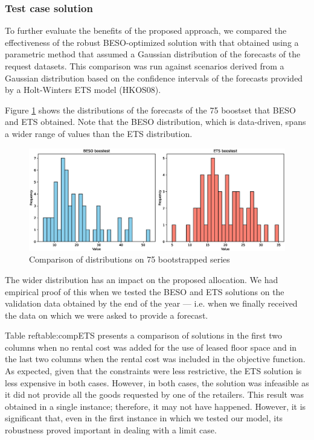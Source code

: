 \documentclass[ijoc,sglanonrev]{informs4}
\begin{document}
\subsubsection*{Test case solution}

To further evaluate the benefits of the proposed approach, we compared the effectiveness of the robust BESO-optimized solution with that obtained using a parametric method that assumed a Gaussian distribution of the forecasts of the request datasets. This comparison was run against scenarios derived from a Gaussian distribution based on the confidence intervals of the forecasts provided by a Holt-Winters ETS model (HKOS08).

Figure \ref{fig:compDistr75} shows the distributions of the forecasts of the 75 boostset that BESO and ETS obtained. Note that the BESO distribution, which is data-driven, spans a wider range of values than the ETS distribution.

\begin{figure}[ht] 
    \centering
    \includegraphics[width=0.75\linewidth]{compDistr.eps}%
    \caption{Comparison of distributions on 75 bootstrapped series}
    \label{fig:compDistr75}
\end{figure}

The wider distribution has an impact on the proposed allocation. We had empirical proof of this when we tested the BESO and ETS solutions on the validation data obtained by the end of the year — i.e. when we finally received the data on which we were asked to provide a forecast.

Table ref{table:compETS} presents a comparison of solutions in the first two columns when no rental cost was added for the use of leased floor space and in the last two columns when the rental cost was included in the objective function. As expected, given that the constraints were less restrictive, the ETS solution is less expensive in both cases. However, in both cases, the solution was infeasible as it did not provide all the goods requested by one of the retailers. This result was obtained in a single instance; therefore, it may not have happened. However, it is significant that, even in the first instance in which we tested our model, its robustness proved important in dealing with a limit case.
\end{document}
